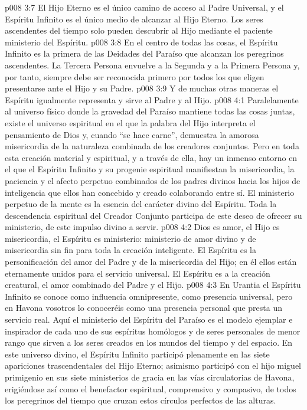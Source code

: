 \vs p008 3:7 El Hijo Eterno es el único camino de acceso al Padre Universal, y el Espíritu Infinito es el único medio de alcanzar al Hijo Eterno. Los seres ascendentes del tiempo solo pueden descubrir al Hijo mediante el paciente ministerio del Espíritu.
\vs p008 3:8 En el centro de todas las cosas, el Espíritu Infinito es la primera de las Deidades del Paraíso que alcanzan los peregrinos ascendentes. La Tercera Persona envuelve a la Segunda y a la Primera Persona y, por tanto, siempre debe ser reconocida primero por todos los que eligen presentarse ante el Hijo y su Padre.
\vs p008 3:9 Y de muchas otras maneras el Espíritu igualmente representa y sirve al Padre y al Hijo.
\vs p008 4:1 Paralelamente al universo físico donde la gravedad del Paraíso mantiene todas las cosas juntas, existe el universo espiritual en el que la palabra del Hijo interpreta el pensamiento de Dios y, cuando “se hace carne”, demuestra la amorosa misericordia de la naturaleza combinada de los creadores conjuntos. Pero en toda esta creación material y espiritual, y a través de ella, hay un inmenso entorno en el que el Espíritu Infinito y su progenie espiritual manifiestan la misericordia, la paciencia y el afecto perpetuo combinados de los padres divinos hacia los hijos de inteligencia que ellos han concebido y creado colaborando entre sí. El ministerio perpetuo de la mente es la esencia del carácter divino del Espíritu. Toda la descendencia espiritual del Creador Conjunto participa de este deseo de ofrecer su ministerio, de este impulso divino a servir.
\vs p008 4:2 Dios es amor, el Hijo es misericordia, el Espíritu es ministerio: ministerio de amor divino y de misericordia sin fin para toda la creación inteligente. El Espíritu es la personificación del amor del Padre y de la misericordia del Hijo; en él ellos están eternamente unidos para el servicio universal. El Espíritu es  a la creación creatural, el amor combinado del Padre y el Hijo.
\vs p008 4:3 En Urantia el Espíritu Infinito se conoce como influencia omnipresente, como presencia universal, pero en Havona vosotros lo conoceréis como una presencia personal que presta un servicio real. Aquí el ministerio del Espíritu del Paraíso es el modelo ejemplar e inspirador de cada uno de sus espíritus homólogos y de seres personales de menor rango que sirven a los seres creados en los mundos del tiempo y del espacio. En este universo divino, el Espíritu Infinito participó plenamente en las siete apariciones trascendentales del Hijo Eterno; asimismo participó con el hijo miguel primigenio en sus siete ministerios de gracia en las vías circulatorias de Havona, erigiéndose así como el benefactor espiritual, comprensivo y compasivo, de todos los peregrinos del tiempo que cruzan estos círculos perfectos de las alturas.
